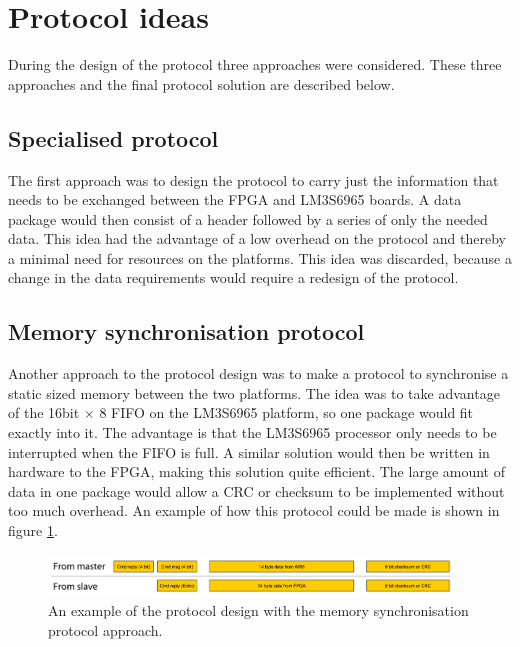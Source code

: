 \section{Protocol ideas}
\label{spi_protocol_ideas}
During the design of the protocol three approaches were considered. These three approaches and the final protocol solution are described below.


\subsection{Specialised protocol}
The first approach was to design the protocol to carry just the information that needs to be exchanged between the FPGA and LM3S6965 boards. A data package would then consist of a header followed by a series of only the needed data. This idea had the advantage of a low overhead on the protocol and thereby a minimal need for resources on the platforms. This idea was discarded, because a change in the data requirements would require a redesign of the protocol.

\subsection{Memory synchronisation protocol}
Another approach to the protocol design was to make a protocol to synchronise a static sized memory between the two platforms. The idea was to take advantage of the 16bit $ \times $ 8 FIFO on the LM3S6965 platform, so one package would fit exactly into it. The advantage is that the LM3S6965 processor only needs to be interrupted when the FIFO is full. A similar solution would then be written in hardware to the FPGA, making this solution quite efficient. The large amount of data in one package would allow a CRC or checksum to be implemented without too much overhead. An example of how this protocol could be made is shown in figure \ref{fig:spi_protocol_format_memsync}.


\begin{figure}[htb]
	\centering
	\includegraphics[width=0.96\textwidth,trim=0 0 0 0]{graphics/spi_protocol_format_memsync.pdf} %
	\caption{An example of the protocol design with the memory synchronisation protocol approach.}
	\label{fig:spi_protocol_format_memsync}			%
\end{figure}


